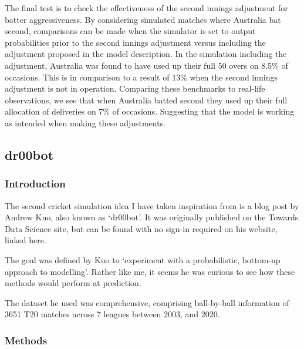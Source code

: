 The final test is to check the effectiveness of the second innings adjustment for batter aggressiveness. By considering simulated matches where Australia bat second, comparisons can be made when the simulator is set to output probabilities prior to the second innings adjustment versus including the adjustment proposed in the model description. In the simulation including the adjustment, Australia was found to have used up their full 50 overs on 8.5\% of occasions. This is in comparison to a result of 13\% when the second innings adjustment is not in operation. Comparing these benchmarks to real-life observations, we see that when Australia batted second they used up their full allocation of deliveries on 7\% of occasions. Suggesting that the model is working as intended when making these adjustments.

\subsection{dr00bot}

\subsubsection{Introduction}

The second cricket simulation idea I have taken inspiration from is a blog post by Andrew Kuo, also known as ‘dr00bot’. It was originally published on the Towards Data Science site, but can be found with no sign-in required on his website, linked here. \cite{kuo_predicting_2021}

The goal was defined by Kuo to ‘experiment with a probabilistic, bottom-up approach to modelling’. Rather like me, it seems he was curious to see how these methods would perform at prediction.

The dataset he used was comprehensive, comprising ball-by-ball information of 3651 T20 matches across 7 leagues between 2003, and 2020.

\subsubsection{Methods}

